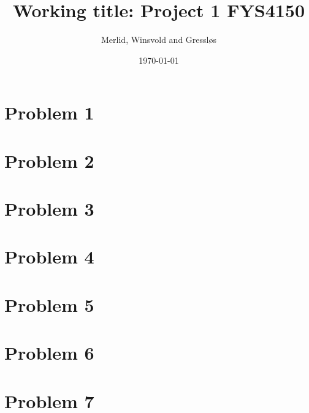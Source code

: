 \documentclass[aps,rmp,preprint,amsmath,amssymb,longbibliography,floatfix]{revtex4-1}
\begin{document}
\title{Working title: Project 1 FYS4150}

\author{Merlid, Winsvold and Gressløs}
\date{\today}


\begin{abstract}

\end{abstract}

\maketitle

\tableofcontents

\section{Problem 1}
\label{sec:prob1}


\section{Problem 2}
\label{sec:prob2}


\section{Problem 3}
\label{sec:prob3}


\section{Problem 4}
\label{sec:prob4}

\section{Problem 5}
\label{sec:prob5}

\section{Problem 6}
\label{sec:prob6}

\section{Problem 7}
\label{sec:prob7}
\end{document}
